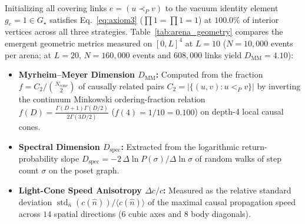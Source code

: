 \documentclass[11pt,a4paper]{article}
\theoremstyle{definition}
\theoremstyle{remark}
\newcommand{\Gstar}{G_\star}
\begin{document}
Initializing all covering links $e = (u \prec_P v)$ to the vacuum identity element $g_e = 1 \in \Gstar$ satisfies Eq.~\eqref{eq:axiom3} ($\prod 1 = \prod 1 = 1$) at $100.0\%$ of interior vertices across all three strategies. Table~\ref{tab:arena_geometry} compares the emergent geometric metrics measured on $[0, L]^4$ at $L = 10$ ($N = 10{,}000$ events per arena; at $L = 20$, $N = 160{,}000$ events and $608{,}000$ links yield $D_{\mathrm{MM}} = 4.10$):
\begin{itemize}
    \item \textbf{Myrheim--Meyer Dimension $D_{\mathrm{MM}}$:} Computed from the fraction $f = C_2 / \binom{N_{\mathrm{cone}}}{2}$ of causally related pairs $C_2 = |\{(u, v) : u <_P v\}|$ by inverting the continuum Minkowski ordering-fraction relation~\cite{Myrheim1978} $f(D) = \frac{\Gamma(D+1)\Gamma(D/2)}{2\Gamma(3D/2)}$ ($f(4) = 1/10 = 0.100$) on depth-4 local causal cones.
    \item \textbf{Spectral Dimension $D_{\mathrm{spec}}$:} Extracted from the logarithmic return-probability slope $D_{\mathrm{spec}} = -2\,\Delta\ln P(\sigma)/\Delta\ln\sigma$ of random walks of step count $\sigma$ on the poset graph.
    \item \textbf{Light-Cone Speed Anisotropy $\Delta c / c$:} Measured as the relative standard deviation $\operatorname{std}_{\hat{n}}(c(\hat{n})) / \langle c(\hat{n})\rangle$ of the maximal causal propagation speed across $14$ spatial directions ($6$ cubic axes and $8$ body diagonals).
\end{itemize}

\begin{table}[!htbp]
\centering
\caption{Experiment 1: Vacuum stability and emergent 4D spacetime geometry across the three arena strategies at $L = 10$ ($N = 10{,}000$ events).}
\label{tab:arena_geometry}
\end{table}
\end{document}

